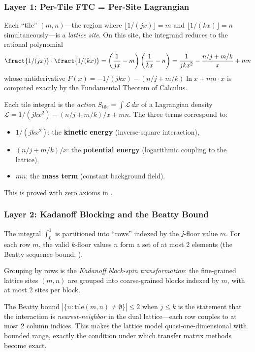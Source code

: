 \subsubsection{Layer 1: Per-Tile FTC = Per-Site Lagrangian}

Each ``tile'' $(m,n)$---the region where $\lfloor 1/(jx) \rfloor = m$
and $\lfloor 1/(kx) \rfloor = n$ simultaneously---is a \emph{lattice site}.
On this site, the integrand reduces to the rational polynomial
\[
  \fract{1/(jx)} \cdot \fract{1/(kx)} =
  \left(\frac{1}{jx} - m\right)\left(\frac{1}{kx} - n\right)
  = \frac{1}{jkx^2} - \frac{n/j + m/k}{x} + mn
\]
whose antiderivative $F(x) = -1/(jkx) - (n/j + m/k)\ln x + mn \cdot x$
is computed exactly by the Fundamental Theorem of Calculus.

\begin{principle}
Each tile integral is the \emph{action} $S_{\mathrm{tile}} = \int \mathcal{L}\,dx$
of a Lagrangian density $\mathcal{L} = 1/(jkx^2) - (n/j+m/k)/x + mn$.
The three terms correspond to:
\begin{itemize}
  \item $1/(jkx^2)$: the \textbf{kinetic energy} (inverse-square interaction),
  \item $(n/j + m/k)/x$: the \textbf{potential energy} (logarithmic coupling to the lattice),
  \item $mn$: the \textbf{mass term} (constant background field).
\end{itemize}
This is proved with zero axioms in .
\end{principle}

\subsubsection{Layer 2: Kadanoff Blocking and the Beatty Bound}

The integral $\int_0^1$ is partitioned into ``rows'' indexed by the
$j$-floor value $m$. For each row $m$, the valid $k$-floor values
$n$ form a set of at most 2 elements (the Beatty sequence bound,
).

\begin{correspondence}
Grouping by rows is the \emph{Kadanoff block-spin transformation}:
the fine-grained lattice sites $(m,n)$ are grouped into coarse-grained
blocks indexed by $m$, with at most 2 sites per block.

The Beatty bound $|\{n : \text{tile}(m,n) \neq \emptyset\}| \leq 2$
when $j \leq k$ is the statement that the interaction is
\emph{nearest-neighbor} in the dual lattice---each row couples to at
most 2 column indices. This makes the lattice model quasi-one-dimensional
with bounded range, exactly the condition under which transfer matrix
methods become exact.
\end{correspondence}

